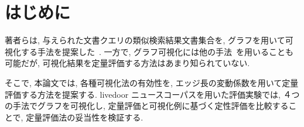 \documentclass[a4j,fleqn,10pt]{jarticle}
\begin{document}


\maketitle


\section{はじめに}\label{sec:INTRO}
著者らは, 与えられた文書クエリの類似検索結果文書集合を, グラフを用いて可視化する手法を提案した~\cite{ozaki}. 
一方で, グラフ可視化には他の手法~\cite{saito}を用いることも可能だが, 
可視化結果を定量評価する方法はあまり知られていない.

そこで, 本論文では, 各種可視化法の有効性を, エッジ長の変動係数を用いて定量評価する方法を提案する. 
livedoor ニュースコーパスを用いた評価実験では, ４つの手法でグラフを可視化し,
定量評価と可視化例に基づく定性評価を比較することで, 定量評価法の妥当性を検証する. 
\end{document}
